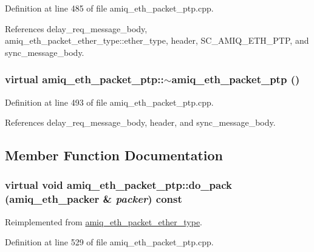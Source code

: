 Definition at line 485 of file amiq\_\-eth\_\-packet\_\-ptp.cpp.

References delay\_\-req\_\-message\_\-body, amiq\_\-eth\_\-packet\_\-ether\_\-type::ether\_\-type, header, SC\_\-AMIQ\_\-ETH\_\-PTP, and sync\_\-message\_\-body.\hypertarget{classamiq__eth__packet__ptp_a3970961ac5aec4bb174e10bc463117bb}{
\subsubsection[{$\sim$amiq\_\-eth\_\-packet\_\-ptp}]{\setlength{\rightskip}{0pt plus 5cm}virtual amiq\_\-eth\_\-packet\_\-ptp::$\sim$amiq\_\-eth\_\-packet\_\-ptp ()}}
\label{classamiq__eth__packet__ptp_a3970961ac5aec4bb174e10bc463117bb}


Definition at line 493 of file amiq\_\-eth\_\-packet\_\-ptp.cpp.

References delay\_\-req\_\-message\_\-body, header, and sync\_\-message\_\-body.

\subsection{Member Function Documentation}
\hypertarget{classamiq__eth__packet__ptp_a5d415af5fcb6ed2cb603aaf0105fdd43}{
\subsubsection[{do\_\-pack}]{\setlength{\rightskip}{0pt plus 5cm}virtual void amiq\_\-eth\_\-packet\_\-ptp::do\_\-pack ({\bf amiq\_\-eth\_\-packer} \& {\em packer}) const}}
\label{classamiq__eth__packet__ptp_a5d415af5fcb6ed2cb603aaf0105fdd43}


Reimplemented from \hyperlink{classamiq__eth__packet__ether__type_a62fe5f26a466f0bd0045599b89aa6926}{amiq\_\-eth\_\-packet\_\-ether\_\-type}.

Definition at line 529 of file amiq\_\-eth\_\-packet\_\-ptp.cpp.

